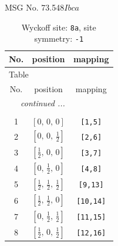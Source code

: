 \documentclass[fleqn,8pt]{jsarticle}
\begin{document}
\setcounter{MaxMatrixCols}{32}

\renewcommand{\tablename}{Table~}
\renewcommand{\figurename}{Figure~}
\begin{center}
\LARGE
MSG No. 73.548\quad$Ibca$
\end{center}
\renewcommand{\arraystretch}{1.2}
\begin{longtable}{ccc}
\caption{Wyckoff site: {\tt 8a}, site symmetry: {\tt -1}}
 \\
 \hline \hline
No. & position & mapping \\ \hline \endfirsthead

\multicolumn{2}{l}{\tablename\ \thetable{}} \\
 \hline \hline
No. & position & mapping \\ \hline \endhead

 \hline \hline
\multicolumn{2}{r}{\footnotesize\it continued ...} \\ \endfoot

 \hline \hline
\multicolumn{2}{r}{} \\ \endlastfoot

1 & $\left[ 0,\, 0,\, 0 \right]$ & {\tt [1,5]} \\ \hline
2 & $\left[ 0,\, 0,\, \frac{1}{2} \right]$ & {\tt [2,6]} \\ \hline
3 & $\left[ \frac{1}{2},\, 0,\, 0 \right]$ & {\tt [3,7]} \\ \hline
4 & $\left[ 0,\, \frac{1}{2},\, 0 \right]$ & {\tt [4,8]} \\ \hline
5 & $\left[ \frac{1}{2},\, \frac{1}{2},\, \frac{1}{2} \right]$ & {\tt [9,13]} \\ \hline
6 & $\left[ \frac{1}{2},\, \frac{1}{2},\, 0 \right]$ & {\tt [10,14]} \\ \hline
7 & $\left[ 0,\, \frac{1}{2},\, \frac{1}{2} \right]$ & {\tt [11,15]} \\ \hline
8 & $\left[ \frac{1}{2},\, 0,\, \frac{1}{2} \right]$ & {\tt [12,16]} \\
\end{longtable}
\renewcommand{\arraystretch}{1.2}
\end{document}
